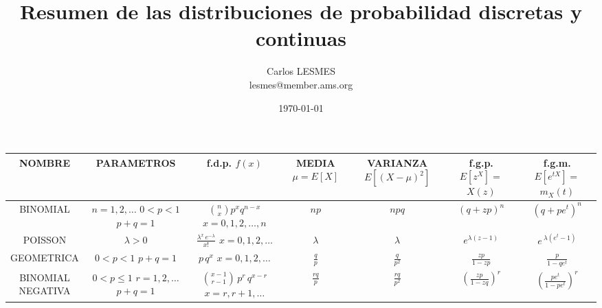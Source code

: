 \documentclass[11pt]{report}
\title{Resumen de las distribuciones de probabilidad discretas y continuas}
\author{Carlos LESMES \\lesmes@member.ams.org}
\date{\today}
\begin{document}
\maketitle
\newpage
\pagestyle{empty}
\begin{landscape}
\begin{tabular}{|c|c|c|c|c|c|c|}
\hline 
\parbox[c][2\height][c]{1.2in}{NOMBRE} & \parbox[c][2\height][c]{1.2in}{PARAMETROS} & \parbox[c][2\height][c]{1.3in}{f.d.p. \\ $ f(x) $}  & \parbox[c][2\height][c]{0.8in}{MEDIA \\$ \mu=E[X] $} & \parbox[c][2\height][c]{1in}{ VARIANZA \\$ E[(X-\mu)^{2}] $}& \parbox[c][2\height][c]{0.8in}{ f.g.p. \\$
E[z^{X}]=$\\$X(z)$} & \parbox[c][2\height][c]{1in}{f.g.m. \\$ E[e^{tX}]=$\\$m_{X}(t)$}\\ 
\hline 
\parbox[c][2\height][c]{1.2in}{BINOMIAL} & \parbox[c][2\height][c]{1.2in}{$ n=1,2,\dots $\\$ 0 < p < 1 $\\$ p+q=1 $} & \parbox[c][2\height][c]{1.3in}{$ \displaystyle \binom{n}{x}p^{x}q^{n-x} $\\$ x=0,1,2,\dots,n $} &  $ np $ & $ npq $ & $ (q+zp)^{n}$ & $ (q+pe^{t})^{n} $\\ 
\hline 
\parbox[c][2\height][c]{1.2in}{POISSON }& \parbox[c][2\height][c]{1.2in}{$ \lambda > 0 $} & \parbox[c][2\height][c]{1.3in}{$ \displaystyle \frac{\lambda^{x}\, e^{-\lambda}}{x!} $ \\ $ x=0,1,2,\dots $} & $ \lambda $ & $ \lambda $ & $ e^{\lambda(z-1)} $ & $ e\, ^{\lambda \displaystyle (e^{t}-1)} $\\ 
\hline 
\parbox[c][2\height][c]{1.2in}{GEOMETRICA} & \parbox[c][2\height][c]{1.2in}{$ 0< p < 1 $\\$ p+q=1 $} & \parbox[c][2\height][c]{1.3in}{ $ p\, q^{x} $ \\ $ x=0,1,2,\dots $}  & $ \displaystyle \frac{q}{p} $& $ \displaystyle \frac{q}{p^{2}} $ & $ \displaystyle \frac{zp}{1-zp} $ & $ \displaystyle \frac{p}{1-qe^{t}} $\\ 
\hline 
\parbox[c][2\height][c]{1.2in}{BINOMIAL\\ NEGATIVA} & \parbox[c][2\height][c]{1.2in}{ $ 0< p \leq 1 $ \\ $ r=1,2,\dots $\\ $ p+q=1 $} & \parbox[c][2\height][c]{1.3in}{$ \displaystyle \binom{x-1}{r-1}\,p^{r}\, q^{x-r} $ \\ $ x=r,r+1,\dots $} & $ \displaystyle \frac{rq}{p} $ & $ \displaystyle \frac{rq}{p^{2}} $ & $ \left( \displaystyle \frac{zp}{1-zq} \right) ^{r} $ & $ \left(\displaystyle \frac{pe^{t}}{1-pe^{t}}\right)^{r} $\\ 
\hline 
\end{tabular} 
\end{landscape}
\end{document}
